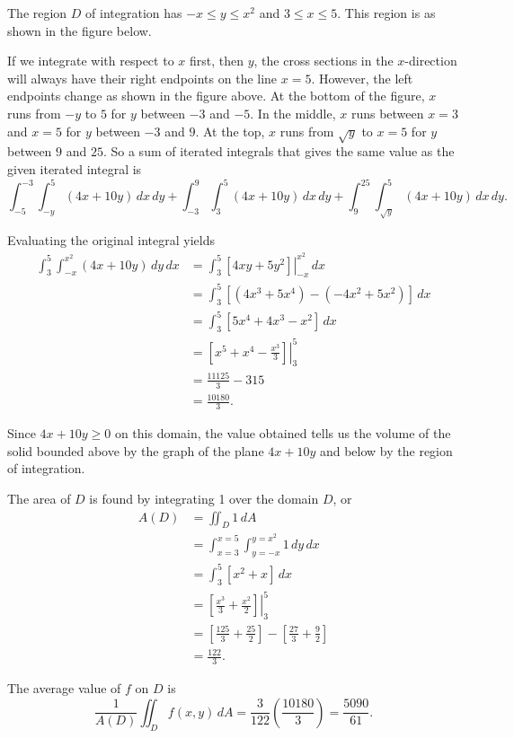 \begin{activitySolution}
   \ba
    \item The region $D$ of integration has $-x \leq y \leq x^2$ and $3 \leq x \leq 5$. This region is as shown in the figure below.
\begin{center}
\end{center}


    \item If we integrate with respect to $x$ first, then $y$, the cross sections in the $x$-direction will always have their right endpoints on the line $x=5$. However, the left endpoints change as shown in the figure above. At the bottom of the figure, $x$ runs from $-y$ to $5$ for $y$ between $-3$ and $-5$. In the middle, $x$ runs between $x=3$ and $x=5$ for $y$ between $-3$ and $9$. At the top, $x$ runs from $\sqrt{y}$ to $x=5$ for $y$ between $9$ and $25$. So a sum of  iterated integrals that gives the same value as the given iterated integral is 
\[\int_{-5}^{-3} \int_{-y}^{5} (4x+10y) \, dx \, dy + \int_{-3}^{9} \int_{3}^{5} (4x+10y) \, dx \, dy + \int_{9}^{25} \int_{\sqrt{y}}^{5} (4x+10y) \, dx \, dy.\]

    \item Evaluating the original integral yields
\begin{align*}
\int_3^5 \int_{-x}^{x^2} (4x+10y) \, dy \, dx &= \int_3^5 \left. \left[4xy+5y^2\right] \right|_{-x}^{x^2} \, dx \\
	&= \int_3^5  \left[\left(4x^3+5x^4\right) - \left(-4x^2+5x^2\right)\right] \, dx \\
	&= \int_3^5  \left[5x^4+4x^3-x^2\right] \, dx \\
	&= \left. \left[x^5+x^4-\frac{x^3}{3}\right] \right|_3^5  \\
	&= \frac{11125}{3} - 315 \\
	&= \frac{10180}{3}.
\end{align*}

Since $4x+10y \geq 0$ on this domain, the value obtained tells us the volume of the solid bounded above by the graph of the plane $4x+10y$ and below by the region of integration. 

\item The area of $D$ is found by integrating 1 over the domain $D$, or
\begin{align*}
A(D) &= \iint_D 1 \, dA \\
	&= \int_{x=3}^{x=5} \int_{y=-x}^{y=x^2} 1 \, dy \, dx \\
	&= \int_3^5  \left[x^2+x\right] \, dx \\
	&= \left. \left[\frac{x^3}{3}+\frac{x^2}{2}\right] \right|_3^5  \\
	&= \left[\frac{125}{3} + \frac{25}{2}\right] - \left[\frac{27}{3}+\frac{9}{2}\right] \\
	&= \frac{122}{3}.
\end{align*}

\item The average value of $f$ on $D$ is 
\[\frac{1}{A(D)} \iint_D f(x,y) \, dA = \frac{3}{122}\left(\frac{10180}{3}\right) = \frac{5090}{61}.\]

    \ea
\end{activitySolution}
\aftera
